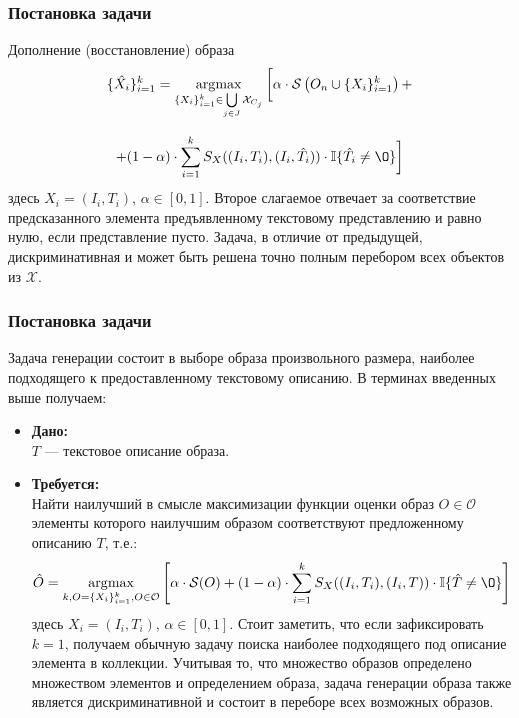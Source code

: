 \documentclass[10pt]{beamer}
\DeclareMathOperator*{\argmax}{\arg\!\max}
\begin{document}
\begin{frame}
	\frametitle{Постановка задачи}
	\begin{block}{Дополнение (восстановление) образа}
		$$\{\hat{X_i}\}_{i=1}^k= \argmax_{\{X_i\}_{i=1}^k\in\bigcup\limits_{j\in J}\mathcal{X}_{C_j}} \bigg{[}\alpha \cdot \mathcal{S}\left(O_n\cup\{X_i\}_{i=1}^k\right) + $$
		
		$$+ (1-\alpha) \cdot \sum\limits_{i=1}^k S_X((I_i, T_i), (I_i, \hat{T_i}))\cdot\mathbb{I}\{\hat{T_i}\neq\O\}  \bigg{]}$$				
		здесь $X_i = (I_i, T_i)$, $\alpha\in[0,1]$. Второе слагаемое отвечает за соответствие предсказанного элемента предъявленному текстовому представлению и равно нулю, если представление пусто. Задача, в отличие от предыдущей, дискриминативная и  может быть решена точно полным перебором всех объектов из $\mathcal{X}$.
	\end{block}					
\end{frame}


\begin{frame}
	\frametitle{Постановка задачи}
	Задача генерации состоит в выборе образа произвольного размера, наиболее подходящего к предоставленному текстовому описанию. В терминах введенных выше получаем:
	
	\begin{itemize}
		\item \textbf{Дано:}\\
		$T$ --- текстовое описание образа.
		
		\item \textbf{Требуется:}\\
		Найти наилучший в смысле максимизации функции оценки образ $O\in\mathcal{O}$ элементы которого наилучшим образом соответствуют предложенному описанию $T$, т.е.:
		$$ \hat{O} = \argmax_{k,O = \{X_i\}_{i=1}^{k},  O\in\mathcal{O}} \left[\alpha \cdot \mathcal{S}(O) + (1-\alpha) \cdot \sum\limits_{i=1}^{k} S_X((I_i, T_i), (I_i, T))\cdot\mathbb{I}\{\hat{T}\neq\O\}  \right]$$				
		здесь $X_i = (I_i, T_i)$, $\alpha\in[0,1]$. 
		Стоит заметить, что если зафиксировать $k=1$, получаем обычную задачу поиска наиболее подходящего под описание элемента в коллекции. Учитывая то, что множество образов определено множеством элементов и определением образа, задача генерации образа также является дискриминативной и состоит в переборе всех возможных образов.
	\end{itemize}			
\end{frame}
\end{document}
